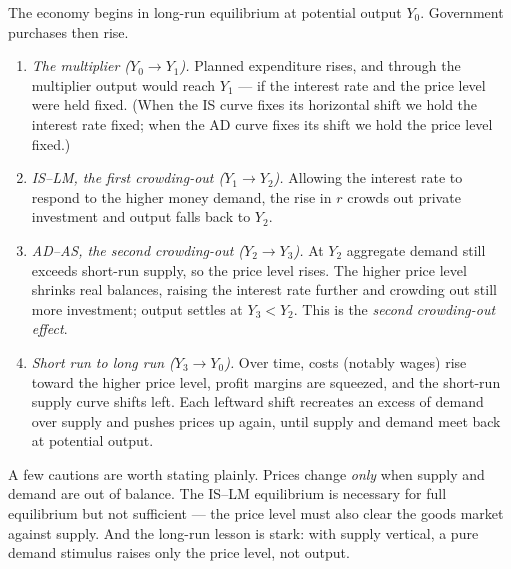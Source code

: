 The economy begins in long-run equilibrium at potential output $Y_0$. Government purchases then rise.
\begin{enumerate}
\item \emph{The multiplier ($Y_0\to Y_1$).} Planned expenditure rises, and through the multiplier output would reach $Y_1$ --- if the interest rate and the price level were held fixed. (When the IS curve fixes its horizontal shift we hold the interest rate fixed; when the AD curve fixes its shift we hold the price level fixed.)
\item \emph{IS--LM, the first crowding-out ($Y_1\to Y_2$).} Allowing the interest rate to respond to the higher money demand, the rise in $r$ crowds out private investment and output falls back to $Y_2$.
\item \emph{AD--AS, the second crowding-out ($Y_2\to Y_3$).} At $Y_2$ aggregate demand still exceeds short-run supply, so the price level rises. The higher price level shrinks real balances, raising the interest rate further and crowding out still more investment; output settles at $Y_3<Y_2$. This is the \emph{second crowding-out effect}.
\item \emph{Short run to long run ($Y_3\to Y_0$).} Over time, costs (notably wages) rise toward the higher price level, profit margins are squeezed, and the short-run supply curve shifts left. Each leftward shift recreates an excess of demand over supply and pushes prices up again, until supply and demand meet back at potential output.
\end{enumerate}


A few cautions are worth stating plainly. Prices change \emph{only} when supply and demand are out of balance. The IS--LM equilibrium is necessary for full equilibrium but not sufficient --- the price level must also clear the goods market against supply. And the long-run lesson is stark: with supply vertical, a pure demand stimulus raises only the price level, not output.


